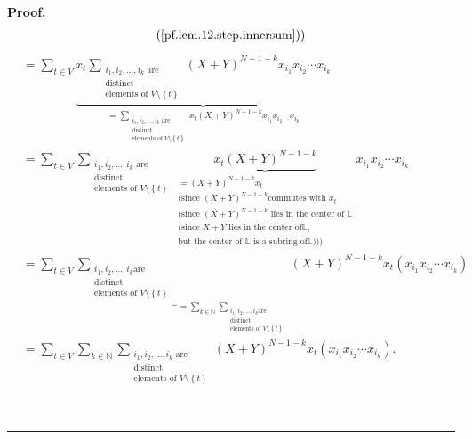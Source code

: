 \documentclass[numbers=enddot,12pt,final,onecolumn,notitlepage]{scrartcl}%
\theoremstyle{definition}
\newenvironment{proof}[1][Proof]{\noindent\textbf{#1.} }{\ \rule{0.5em}{0.5em}}
\let\sumnonlimits\sum
\renewcommand{\sum}{\sumnonlimits\limits}
\newenvironment{verlong}{}{}
\begin{document}
\begin{verlong}
\begin{proof}
\begin{align*}
{{{(\ref{pf.lem.12.step.innersum}))}}}
\end{align*}%
\begin{align}
&  =\sum_{t\in V}\underbrace{x_{t}\sum_{\substack{i_{1},i_{2},\ldots
,i_{k}\text{ are}\\\text{distinct}\\\text{elements of }V\setminus\left\{
t\right\}  }}\left(  X+Y\right)  ^{N-1-k}x_{i_{1}}x_{i_{2}}\cdots x_{i_{k}}%
}_{=\sum_{\substack{i_{1},i_{2},\ldots,i_{k}\text{ are}\\\text{distinct}%
\\\text{elements of }V\setminus\left\{  t\right\}  }}x_{t}\left(  X+Y\right)
^{N-1-k}x_{i_{1}}x_{i_{2}}\cdots x_{i_{k}}}\nonumber\\
&  =\sum_{t\in V}\sum_{\substack{i_{1},i_{2},\ldots,i_{k}\text{ are}%
\\\text{distinct}\\\text{elements of }V\setminus\left\{  t\right\}
}}\underbrace{x_{t}\left(  X+Y\right)  ^{N-1-k}}_{\substack{=\left(
X+Y\right)  ^{N-1-k}x_{t}\\\text{(since }\left(  X+Y\right)  ^{N-1-k}\text{
commutes with }x_{t}\\\text{(since }\left(  X+Y\right)  ^{N-1-k}\text{ lies in
the center of }\mathbb{L}\\\text{(since }X+Y\text{ lies in the center of
}\mathbb{L}\text{,}\\\text{but the center of }\mathbb{L}\text{ is a subring of
}\mathbb{L}\text{)))}}}x_{i_{1}}x_{i_{2}}\cdots x_{i_{k}}\nonumber\\
&  =\sum_{t\in V}\underbrace{\sum_{\substack{i_{1},i_{2},\ldots,i_{k}\text{
are}\\\text{distinct}\\\text{elements of }V\setminus\left\{  t\right\}  }%
}}_{=\sum_{k\in\mathbb{N}}\sum_{\substack{i_{1},i_{2},\ldots,i_{k}\text{
are}\\\text{distinct}\\\text{elements of }V\setminus\left\{  t\right\}  }%
}}\left(  X+Y\right)  ^{N-1-k}x_{t}\left(  x_{i_{1}}x_{i_{2}}\cdots x_{i_{k}%
}\right) \nonumber\\
&  =\sum_{t\in V}\sum_{k\in\mathbb{N}}\sum_{\substack{i_{1},i_{2},\ldots
,i_{k}\text{ are}\\\text{distinct}\\\text{elements of }V\setminus\left\{
t\right\}  }}\left(  X+Y\right)  ^{N-1-k}x_{t}\left(  x_{i_{1}}x_{i_{2}}\cdots
x_{i_{k}}\right)  . \label{pf.lem.12.step.u1}%
\end{align}



\end{proof}
\end{verlong}
\end{document}
